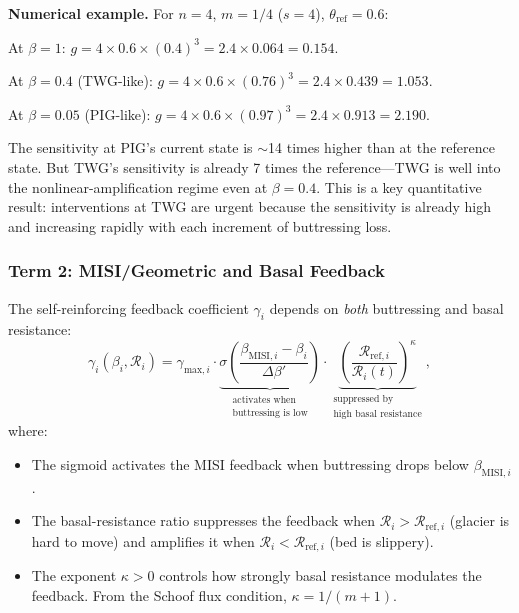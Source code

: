 \documentclass[11pt]{article}
\theoremstyle{definition}
\begin{document}
\textbf{Numerical example.}  For $n = 4$, $m = 1/4$ ($s = 4$), $\theta_{\text{ref}} = 0.6$:

At $\beta = 1$: $g = 4 \times 0.6 \times (0.4)^3 = 2.4 \times 0.064 = 0.154$.

At $\beta = 0.4$ (TWG-like): $g = 4 \times 0.6 \times (0.76)^3 = 2.4 \times 0.439 = 1.053$.

At $\beta = 0.05$ (PIG-like): $g = 4 \times 0.6 \times (0.97)^3 = 2.4 \times 0.913 = 2.190$.

The sensitivity at PIG's current state is $\sim$14 times higher than at the reference state.  But TWG's sensitivity is already 7 times the reference---TWG is well into the nonlinear-amplification regime even at $\beta = 0.4$.  This is a key quantitative result: interventions at TWG are urgent because the sensitivity is already high and increasing rapidly with each increment of buttressing loss.

\subsubsection{Term 2: MISI/Geometric and Basal Feedback}

The self-reinforcing feedback coefficient $\gamma_i$ depends on \emph{both} buttressing and basal resistance:
\begin{equation}
  \gamma_i(\beta_i, \mathcal{R}_i) = \gamma_{\text{max},i} \cdot \underbrace{\sigma\!\left(\frac{\beta_{\text{MISI},i} - \beta_i}{\Delta\beta'}\right)}_{\substack{\text{activates when}\\\text{buttressing is low}}} \cdot \underbrace{\left(\frac{\mathcal{R}_{\text{ref},i}}{\mathcal{R}_i(t)}\right)^{\kappa}}_{\substack{\text{suppressed by}\\\text{high basal resistance}}},
  \label{eq:gamma_full}
\end{equation}
where:
\begin{itemize}
  \item The sigmoid activates the MISI feedback when buttressing drops below $\beta_{\text{MISI},i}$.
  \item The basal-resistance ratio suppresses the feedback when $\mathcal{R}_i > \mathcal{R}_{\text{ref},i}$ (glacier is hard to move) and amplifies it when $\mathcal{R}_i < \mathcal{R}_{\text{ref},i}$ (bed is slippery).
  \item The exponent $\kappa > 0$ controls how strongly basal resistance modulates the feedback.  From the Schoof flux condition, $\kappa = 1/(m+1)$.
\end{itemize}
\end{document}
